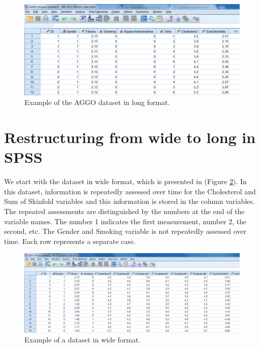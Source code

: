\documentclass[
]{book}
\begin{document}
\begin{figure}

{\centering \includegraphics[width=0.9\linewidth]{images/fig7.3} 

}

\caption{Example of the AGGO dataset in long format.}\label{fig:fig75}
\end{figure}

\hypertarget{restructuring-from-wide-to-long-in-spss}{%
\section{Restructuring from wide to long in SPSS}\label{restructuring-from-wide-to-long-in-spss}}

We start with the dataset in wide format, which is presented in (Figure \ref{fig:fig76}). In this dataset, information is repeatedly assessed over time for the Cholesterol and Sum of Skinfold variables and this information is stored in the column variables. The repeated assessments are distinguished by the numbers at the end of the variable names. The number 1 indicates the first measurement, number 2, the second, etc. The Gender and Smoking variable is not repeatedly assessed over time. Each row represents a separate case.

\begin{figure}

{\centering \includegraphics[width=0.9\linewidth]{images/fig7.6} 

}

\caption{Example of a dataset in wide format.}\label{fig:fig76}
\end{figure}
\end{document}
